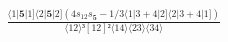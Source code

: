 \documentclass[varwidth, border=5pt]{standalone}
\begin{document}
\begin{my}
$\begin{gathered}
\scriptscriptstyle\frac{⟨1|𝟓|1]⟨2|𝟓|2](4s_{12}s_{𝟓}-1/3⟨1|3+4|2]⟨2|3+4|1])}{⟨12⟩³[12]²⟨14⟩⟨23⟩⟨34⟩}
\end{gathered}$
\end{my}
\end{document}
